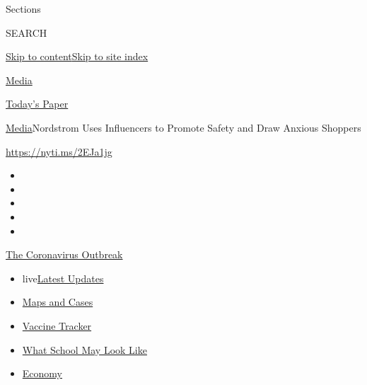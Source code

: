 Sections

SEARCH

\protect\hyperlink{site-content}{Skip to
content}\protect\hyperlink{site-index}{Skip to site index}

\href{https://www.nytimes3xbfgragh.onion/section/business/media}{Media}

\href{https://myaccount.nytimes3xbfgragh.onion/auth/login?response_type=cookie\&client_id=vi}{}

\href{https://www.nytimes3xbfgragh.onion/section/todayspaper}{Today's
Paper}

\href{/section/business/media}{Media}\textbar{}Nordstrom Uses
Influencers to Promote Safety and Draw Anxious Shoppers

\url{https://nyti.ms/2EJa1jg}

\begin{itemize}
\item
\item
\item
\item
\item
\end{itemize}

\href{https://www.nytimes3xbfgragh.onion/news-event/coronavirus?action=click\&pgtype=Article\&state=default\&region=TOP_BANNER\&context=storylines_menu}{The
Coronavirus Outbreak}

\begin{itemize}
\tightlist
\item
  live\href{https://www.nytimes3xbfgragh.onion/2020/08/02/world/coronavirus-updates.html?action=click\&pgtype=Article\&state=default\&region=TOP_BANNER\&context=storylines_menu}{Latest
  Updates}
\item
  \href{https://www.nytimes3xbfgragh.onion/interactive/2020/us/coronavirus-us-cases.html?action=click\&pgtype=Article\&state=default\&region=TOP_BANNER\&context=storylines_menu}{Maps
  and Cases}
\item
  \href{https://www.nytimes3xbfgragh.onion/interactive/2020/science/coronavirus-vaccine-tracker.html?action=click\&pgtype=Article\&state=default\&region=TOP_BANNER\&context=storylines_menu}{Vaccine
  Tracker}
\item
  \href{https://www.nytimes3xbfgragh.onion/interactive/2020/07/29/us/schools-reopening-coronavirus.html?action=click\&pgtype=Article\&state=default\&region=TOP_BANNER\&context=storylines_menu}{What
  School May Look Like}
\item
  \href{https://www.nytimes3xbfgragh.onion/live/2020/07/31/business/stock-market-today-coronavirus?action=click\&pgtype=Article\&state=default\&region=TOP_BANNER\&context=storylines_menu}{Economy}
\end{itemize}

